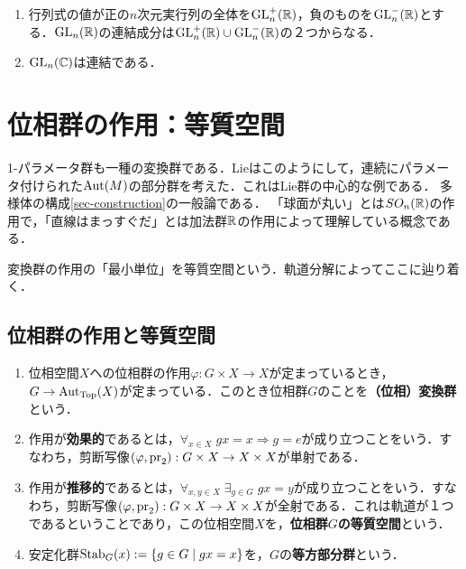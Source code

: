 \documentclass[uplatex,dvipdfmx]{jsreport}
\begin{document}
\begin{example}\mbox{}
    \begin{enumerate}
        \item 行列式の値が正の$n$次元実行列の全体を$\mathrm{GL}^+_n(\mathbb{R})$，負のものを$\mathrm{GL}^-_n(\mathbb{R})$とする．$\mathrm{GL}_n(\mathbb{R})$の連結成分は$\mathrm{GL}_n^+(\mathbb{R})\cup\mathrm{GL}_n^-(\mathbb{R})$の２つからなる．
        \item $\mathrm{GL}_n(\mathbb{C})$は連結である．
    \end{enumerate}
\end{example}

\section{位相群の作用：等質空間}

\begin{tcolorbox}[colframe=ForestGreen, colback=ForestGreen!10!white,breakable,colbacktitle=ForestGreen!40!white,coltitle=black,fonttitle=\bfseries\sffamily,
title=]
    1-パラメータ群も一種の変換群である．Lieはこのようにして，連続にパラメータ付けられた$\mathrm{Aut}(M)$の部分群を考えた．これはLie群の中心的な例である．
    多様体の構成\ref{sec-construction}の一般論である．
    「球面が丸い」とは$SO_n(\mathbb{R})$の作用で，「直線はまっすぐだ」とは加法群$\mathbb{R}$の作用によって理解している概念である．

    変換群の作用の「最小単位」を等質空間という．軌道分解によってここに辿り着く．
\end{tcolorbox}

\subsection{位相群の作用と等質空間}

\begin{definition}\mbox{}
    \begin{enumerate}
        \item 位相空間$X$への位相群の作用$\varphi:G\times X\to X$が定まっているとき，$G\to\mathrm{Aut}_{\mathrm{Top}}(X)$が定まっている．このとき位相群$G$のことを\textbf{（位相）変換群}という．
        \item 作用が\textbf{効果的}であるとは，$\forall_{x\in X}\;gx=x\Rightarrow g=e$が成り立つことをいう．すなわち，剪断写像$(\varphi,\mathrm{pr}_2):G\times X\to X\times X$が単射である．
        \item 作用が\textbf{推移的}であるとは，$\forall_{x,y\in X}\;\exists_{g\in G}\;gx=y$が成り立つことをいう．すなわち，剪断写像$(\varphi,\mathrm{pr}_2):G\times X\to X\times X$が全射である．これは軌道が１つであるということであり，この位相空間$X$を，\textbf{位相群$G$の等質空間}という．
        \item 安定化群$\mathrm{Stab}_G(x):=\left\{g\in G\mid gx=x\right\}$を，$G$の\textbf{等方部分群}という．
    \end{enumerate}
\end{definition}
\end{document}
